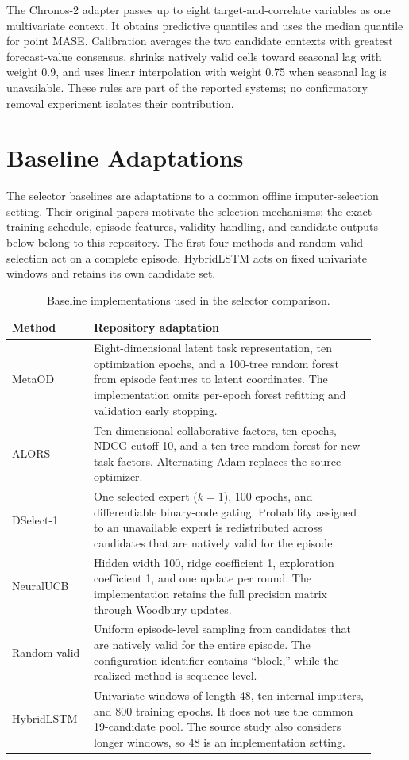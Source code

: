 The Chronos-2 adapter passes up to eight target-and-correlate variables as one multivariate context. It obtains predictive quantiles and uses the median quantile for point MASE. Calibration averages the two candidate contexts with greatest forecast-value consensus, shrinks natively valid cells toward seasonal lag with weight 0.9, and uses linear interpolation with weight 0.75 when seasonal lag is unavailable. These rules are part of the reported systems; no confirmatory removal experiment isolates their contribution.

\section{Baseline Adaptations}
\label{app:baselines}

The selector baselines are adaptations to a common offline imputer-selection setting. Their original papers motivate the selection mechanisms; the exact training schedule, episode features, validity handling, and candidate outputs below belong to this repository. The first four methods and random-valid selection act on a complete episode. HybridLSTM acts on fixed univariate windows and retains its own candidate set.

\begin{table}[h]
\centering
\small
\caption{Baseline implementations used in the selector comparison.}
\label{tab:baseline-adaptations}
\begin{tabular}{p{0.19\linewidth}p{0.72\linewidth}}
\toprule
Method & Repository adaptation \\
\midrule
MetaOD & Eight-dimensional latent task representation, ten optimization epochs, and a 100-tree random forest from episode features to latent coordinates. The implementation omits per-epoch forest refitting and validation early stopping. \\
ALORS & Ten-dimensional collaborative factors, ten epochs, NDCG cutoff 10, and a ten-tree random forest for new-task factors. Alternating Adam replaces the source optimizer. \\
DSelect-1 & One selected expert ($k=1$), 100 epochs, and differentiable binary-code gating. Probability assigned to an unavailable expert is redistributed across candidates that are natively valid for the episode. \\
NeuralUCB & Hidden width 100, ridge coefficient 1, exploration coefficient 1, and one update per round. The implementation retains the full precision matrix through Woodbury updates. \\
Random-valid & Uniform episode-level sampling from candidates that are natively valid for the entire episode. The configuration identifier contains ``block,'' while the realized method is sequence level. \\
HybridLSTM & Univariate windows of length 48, ten internal imputers, and 800 training epochs. It does not use the common 19-candidate pool. The source study also considers longer windows, so 48 is an implementation setting. \\
\bottomrule
\end{tabular}
\end{table}

